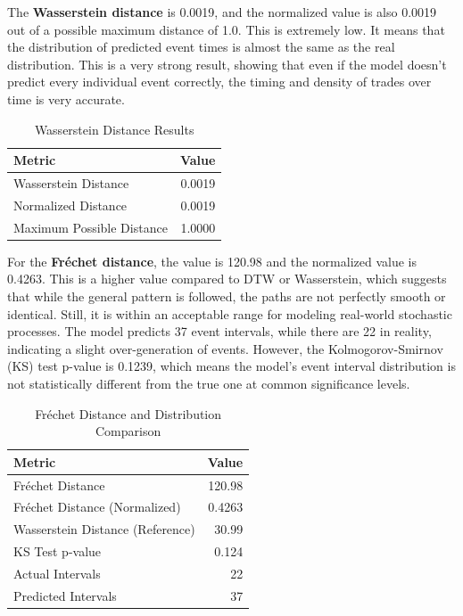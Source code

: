 The \textbf{Wasserstein distance} is 0.0019, and the normalized value is also 0.0019 out of a possible maximum distance of 1.0. This is extremely low. It means that the distribution of predicted event times is almost the same as the real distribution. This is a very strong result, showing that even if the model doesn't predict every individual event correctly, the timing and density of trades over time is very accurate.
\begin{table}[H]
    \centering
    \caption{Wasserstein Distance Results}
    \label{tb:wasserstein-results}
    \begin{tabular}{lr}
    \toprule
    Metric & Value \\
    \midrule
    Wasserstein Distance & 0.0019 \\
    Normalized Distance & 0.0019 \\
    Maximum Possible Distance & 1.0000 \\
    \bottomrule
    \end{tabular}
\end{table}

For the \textbf{Fréchet distance}, the value is 120.98 and the normalized value is 0.4263. This is a higher value compared to DTW or Wasserstein, which suggests that while the general pattern is followed, the paths are not perfectly smooth or identical. Still, it is within an acceptable range for modeling real-world stochastic processes. The model predicts 37 event intervals, while there are 22 in reality, indicating a slight over-generation of events. However, the Kolmogorov-Smirnov (KS) test p-value is 0.1239, which means the model's event interval distribution is not statistically different from the true one at common significance levels.
\begin{table}[H]
\centering
\caption{Fréchet Distance and Distribution Comparison}
\label{tb:frechet-results}
\begin{tabular}{lr}
\toprule
Metric & Value \\
\midrule
Fréchet Distance & 120.98 \\
Fréchet Distance (Normalized) & 0.4263 \\
Wasserstein Distance (Reference) & 30.99 \\
KS Test p-value & 0.124 \\
Actual Intervals & 22 \\
Predicted Intervals & 37 \\
\bottomrule
\end{tabular}
\end{table}

